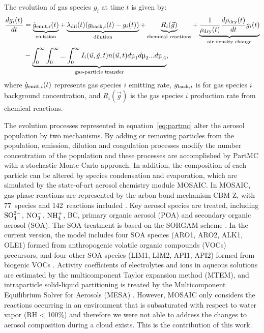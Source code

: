 \documentclass[edeposit,fullpage]{uiucthesis2009}
\begin{document}
The evolution of gas species $g_i$ at time $t$ is given by:
\begin{equation}
\begin{aligned}
 \frac{dg_i(t)}{dt} &= \underbrace{\dot{g}_{{\rm emit}, i}(t)}_\text{emission} + \underbrace{\lambda_{\rm dil}(t)(g_{{\rm back},i}(t) - g_i(t))}_\text{dilution} + \underbrace{R_i(\vec{g})}_\text{chemical reactions} + \underbrace{\frac{1}{\rho_{\rm dry}(t)}\frac{d\rho_{\rm dry}(t)}{dt}g_i(t)}_\text{air density change} \\
 & - \underbrace{\int_0^\infty\int_0^\infty...\int_0^\infty I_i(\vec{u},\vec{g},t)n(\vec{u},t)d\mu_1d\mu_2...d\mu_A}_\text{gas-particle transfer},
\end{aligned}
\label{eq:partmc-gas}
\end{equation}
where $\dot{g}_{{\rm emit}, i}(t)$ represents gas species $i$ emitting rate, $g_{{\rm back},i}$ is for gas species $i$ background concentration, and ${R_i(\vec{g})}$ is the gas species $i$ production rate from chemical reactions. 

The evolution processes represented in equation~\ref{eq:partmc} alter
the aerosol population by two mechanisms. By adding or removing
particles from the population, emission, dilution and coagulation
processes modify the number concentration of the population and these
processes are accomplished by PartMC with a stochastic Monte Carlo
approach. In addition, the composition of each particle can be altered
by species condensation and evaporation, which are simulated by the
state-of-art aerosol chemistry module MOSAIC. In MOSAIC, gas phase
reactions are represented by the arbon bond mechanism CBM-Z, with
77~species and 142~reactions included \citep{Zaveri1999}. Key aerosol
species are treated, including $\rm SO_4^{2-}$, $\rm NO_3^-$, $\rm
NH_4^+$, BC, primary organic aerosol (POA) and secondary organic
aerosol (SOA). The SOA treatment is based on the SORGAM scheme
\citep{schell2001modeling}. In the current version, the model includes
four SOA species (ARO1, ARO2, ALK1, OLE1) formed from anthropogenic
volatile organic compounds (VOCs) precursors, and four other SOA
species (LIM1, LIM2, API1, API2) formed from biogenic VOCs
\citep{ching2012impacts}. Activity coefficients of electrolytes and
ions in aqueous solutions are estimated by the multicomponent Taylor
expansion method (MTEM), and intraparticle solid-liquid partitioning
is treated by the Multicomponent Equilibrium Solver for Aerosols
(MESA) \citep{zaveri2005computationally}. However, MOSAIC only
considers the reactions occurring in an environment that is
subsaturated with respect to water vapor (RH < 100\%) and therefore we
were not able to address the changes to aerosol composition during a
cloud exists. This is the contribution of this work.
\end{document}
